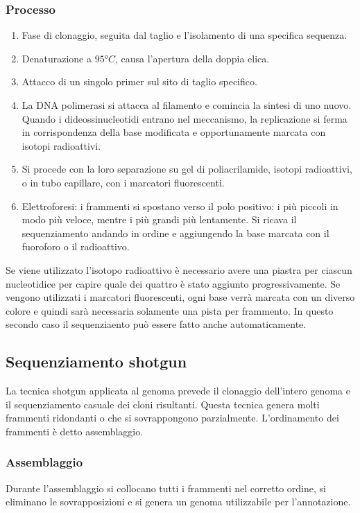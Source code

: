 		\subsubsection{Processo}
		\begin{multicols}{2}
			\begin{enumerate}
    				\item Fase di clonaggio, seguita dal taglio e l'isolamento di una specifica sequenza.
    				\item Denaturazione a $95\si{\degree C}$, causa l'apertura della doppia elica.
    				\item Attacco di un singolo primer sul sito di taglio specifico.
    				\item La DNA polimerasi si attacca al filamento e comincia la sintesi di uno nuovo. 
					Quando i dideossinucleotidi entrano nel meccanismo, la replicazione si ferma in corrispondenza della base modificata e opportunamente marcata con isotopi radioattivi.
    				\item Si procede con la loro separazione su gel di poliacrilamide, isotopi radioattivi, o in tubo capillare, con i marcatori fluorescenti. 
				\item Elettroforesi: i frammenti si spostano verso il polo positivo: i pi\`u piccoli in modo pi\`u veloce, mentre i pi\`u grandi pi\`u lentamente. 
					Si ricava il sequenziamento andando in ordine e aggiungendo la base marcata con il fuoroforo o il radioattivo.
			\end{enumerate}
		\end{multicols}
		Se viene utilizzato l'isotopo radioattivo \`e necessario avere una piastra per ciascun nucleotidice per capire quale dei quattro \`e stato aggiunto progressivamente. 
		Se vengono utilizzati i marcatori fluorescenti, ogni base verr\`a marcata con un diverso colore e quindi sar\`a necessaria solamente una pista per frammento. 
		In questo secondo caso il sequenziaento pu\`o essere fatto anche automaticamente. 

	\subsection{Sequenziamento shotgun}
	La tecnica shotgun applicata al genoma prevede il clonaggio dell'intero genoma e il sequenziamento casuale dei cloni risultanti. 
	Questa tecnica genera molti frammenti ridondanti o che si sovrappongono parzialmente. 
	L'ordinamento dei frammenti \`e detto assemblaggio. 

		\subsubsection{Assemblaggio}
		Durante l'assemblaggio si collocano tutti i frammenti nel corretto ordine, si eliminano le sovrapposizioni e si genera un genoma utilizzabile per l'annotazione.


